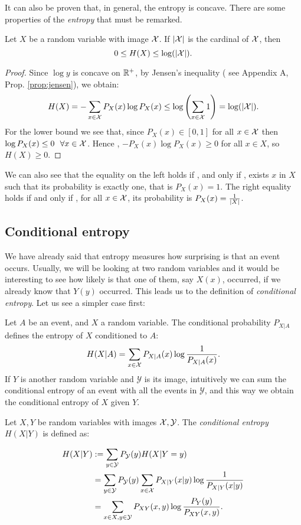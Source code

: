 It can also be proven that, in general, the entropy is concave. There are some properties of the \emph{entropy} that must be remarked. 
\begin{nprop}\label{entr:prop:1}
    Let $X$ be a random variable with image $\mathcal{X}$. If $|\mathcal{X}|$ is the cardinal of $\mathcal{X}$, then
    $$
0 \leq H(X) \leq \log(|\mathcal{X}|).
    $$
\end{nprop}
\begin{proof}
    Since $\log y$ is concave on $\mathbb{R}^+$, by Jensen's inequality ( see Appendix A, Prop. \ref{prop:jensen}), we obtain:
    $$
    H(X) = - \sum_{x \in \mathcal{X}}P_X (x)\log P_X(x) \leq \log\left(\sum_{x \in \mathcal{X}} 1\right) = \log(|\mathcal{X}|).
    $$
    For the lower bound we see that, since $P_X(x) \in [0,1]$ for all  $x \in \mathcal{X} $ then $\log P_X(x) \leq 0 \ \ \forall x \in \mathcal{X}$. Hence , $-P_X(x) \log P_X(x) \geq 0$ for all $x \in X$, so $H(X) \geq 0$.
\end{proof}
We can also see that the equality on the left holds if , and only if , exists $ x $ in  $X$ such that its probability is exactly one, that is $P_X(x) = 1$. The right equality holds if and only if , for all $x \in \mathcal{X}$, its probability is $P_X(x) = \frac{1}{\lvert X\rvert}$.

\subsection*{Conditional entropy}
We have already said that entropy measures how surprising is that an event occurs.
Usually, we will be looking at two random variables and it would be interesting to see how likely is that one of them, say $X(x)$, occurred, if we already know that $Y(y)$ occurred. 
This leads us to the definition of \emph{conditional entropy}. Let us see a simpler case first:

Let $A$ be an event, and $X$ a random variable. The conditional probability $P_{X|A}$ defines the entropy of $X$ conditioned to $ A$:
$$
H(X| A) = \sum_{x \in \mathcal{X}} P_{X|A}(x) \log\frac{1}{P_{X|A}(x)}.
$$
If $Y$ is another random variable and $\mathcal Y$ is its image, intuitively we can sum the conditional entropy of an event with all the events in $\mathcal Y$, and this way we obtain the conditional entropy of $X$ given $Y$.
\begin{ndef}
Let $X,Y$ be random variables with images $\mathcal{X},\mathcal Y$. The \emph{conditional entropy} $H(X | Y)$ is defined as:

\begin{equation*}
    \begin{split}
    H(X|Y) &  :=   \sum_{y \in \mathcal Y} P_{\mathcal Y}(y) H(X| Y = y)  \\ 
    & = \sum_{y \in \mathcal Y} P_{\mathcal  Y}(y) \sum_{x \in \mathcal{X}} P_{X | Y}(x|y)\log\frac{1}{P_{X|Y}(x|y)}  \\
   & = \sum_{x \in X,y \in \mathcal Y}P_{XY}(x,y)\log\frac{P_Y(y)}{P_{XY}(x,y)}.
\end{split}
\end{equation*}
\end{ndef}

